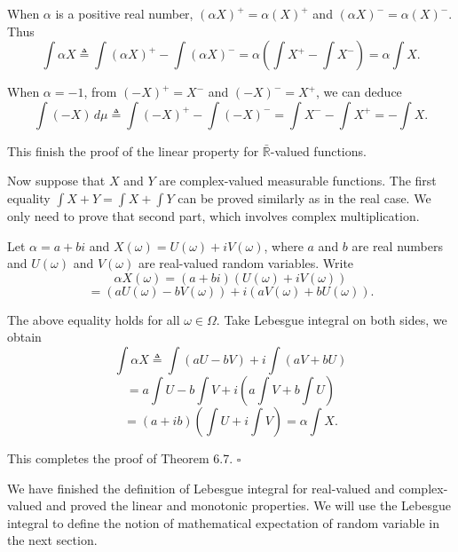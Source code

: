 When $\alpha$ is a positive real number, $(\alpha X)^+ = \alpha(X)^+$ and $(\alpha X)^- = \alpha(X)^-$. Thus
\[
\int \alpha X \triangleq \int (\alpha X)^+ - \int (\alpha X)^-
= \alpha\left(\int X^+ - \int X^-\right)
= \alpha \int X.
\]

When $\alpha=-1$, from $(-X)^+ = X^-$ and $(-X)^- = X^+$, we can deduce
\[
\int (-X)\, d\mu \triangleq \int (-X)^+ - \int (-X)^-
= \int X^- - \int X^+
= -\int X.
\]

This finish the proof of the linear property for $\bar{\mathbb{R}}$-valued functions.

Now suppose that $X$ and $Y$ are complex-valued measurable functions. The first equality $\int X+Y = \int X+\int Y$ can be proved similarly as in the real case. We only need to prove that second part, which involves complex multiplication.

Let $\alpha = a+bi$ and $X(\omega)=U(\omega)+iV(\omega)$, where $a$ and $b$ are real numbers and $U(\omega)$ and $V(\omega)$ are real-valued random variables. Write
\[
\alpha X(\omega)=(a+bi)(U(\omega)+iV(\omega))
\]
\[
= (aU(\omega)-bV(\omega)) + i(aV(\omega)+bU(\omega)).
\]

The above equality holds for all $\omega \in \Omega$. Take Lebesgue integral on both sides, we obtain
\[
\int \alpha X \triangleq \int (aU-bV) + i\int (aV+bU)
\]
\[
= a\int U - b\int V + i\left(a\int V + b\int U\right)
\]
\[
= (a+ib)\left(\int U+i\int V\right)=\alpha \int X.
\]

This completes the proof of Theorem 6.7. \hfill $\square$

We have finished the definition of Lebesgue integral for real-valued and complex-valued and proved the linear and monotonic properties. We will use the Lebesgue integral to define the notion of mathematical expectation of random variable in the next section.
